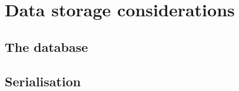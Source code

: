 \chapter{Data storage considerations}
\section{The database}

\label{serialise}
\section{Serialisation}